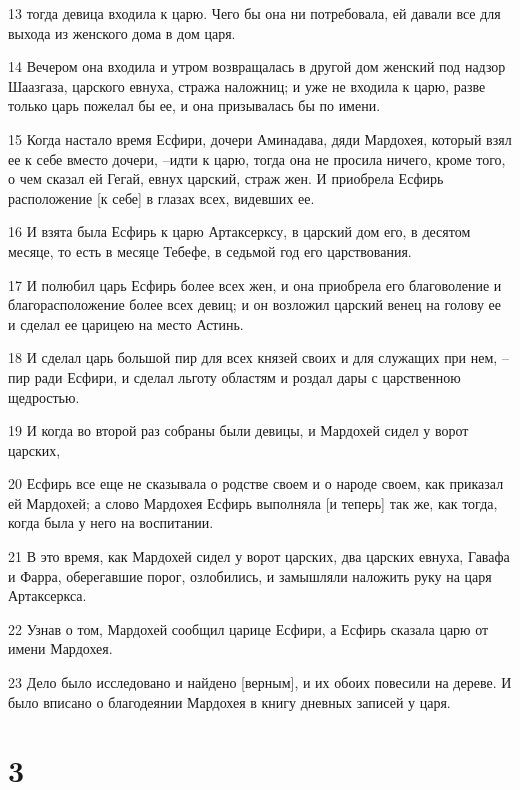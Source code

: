 \par 13 тогда девица входила к царю. Чего бы она ни потребовала, ей давали все для выхода из женского дома в дом царя.
\par 14 Вечером она входила и утром возвращалась в другой дом женский под надзор Шаазгаза, царского евнуха, стража наложниц; и уже не входила к царю, разве только царь пожелал бы ее, и она призывалась бы по имени.
\par 15 Когда настало время Есфири, дочери Аминадава, дяди Мардохея, который взял ее к себе вместо дочери, --идти к царю, тогда она не просила ничего, кроме того, о чем сказал ей Гегай, евнух царский, страж жен. И приобрела Есфирь расположение [к себе] в глазах всех, видевших ее.
\par 16 И взята была Есфирь к царю Артаксерксу, в царский дом его, в десятом месяце, то есть в месяце Тебефе, в седьмой год его царствования.
\par 17 И полюбил царь Есфирь более всех жен, и она приобрела его благоволение и благорасположение более всех девиц; и он возложил царский венец на голову ее и сделал ее царицею на место Астинь.
\par 18 И сделал царь большой пир для всех князей своих и для служащих при нем, --пир ради Есфири, и сделал льготу областям и роздал дары с царственною щедростью.
\par 19 И когда во второй раз собраны были девицы, и Мардохей сидел у ворот царских,
\par 20 Есфирь все еще не сказывала о родстве своем и о народе своем, как приказал ей Мардохей; а слово Мардохея Есфирь выполняла [и теперь] так же, как тогда, когда была у него на воспитании.
\par 21 В это время, как Мардохей сидел у ворот царских, два царских евнуха, Гавафа и Фарра, оберегавшие порог, озлобились, и замышляли наложить руку на царя Артаксеркса.
\par 22 Узнав о том, Мардохей сообщил царице Есфири, а Есфирь сказала царю от имени Мардохея.
\par 23 Дело было исследовано и найдено [верным], и их обоих повесили на дереве. И было вписано о благодеянии Мардохея в книгу дневных записей у царя.

\chapter{3}

